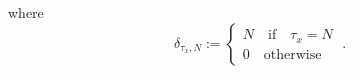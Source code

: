 \documentclass[10pt]{article}
\numberwithin{equation}{section}
\numberwithin{equation}{subsection}
\newcommand{\dt}{\;.}
\begin{document}
where 
\begin{equation}
    \delta_{\tau_{x},N}:=\begin{cases}
        N\quad \text{if}\quad \tau_{x}=N\\
        0\quad \text{otherwise}
    \end{cases}\dt
\end{equation}

\end{document}
